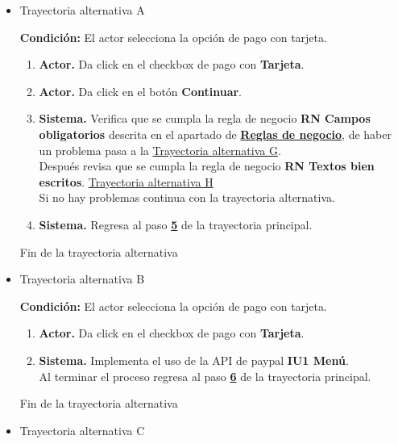 \begin{itemize}
	
	\item \hypertarget{TAA:CU4}{Trayectoria alternativa A}
	
	\noindent \textbf{Condición:} El actor selecciona la opción de pago con tarjeta.
	
	\begin{enumerate}
		\item \textbf{Actor.} Da click en el checkbox de pago con \textbf{Tarjeta}.
		\item \textbf{Actor.} Da click en el botón \textbf{Continuar}.
		\item \textbf{Sistema.} Verifica que se cumpla la regla de negocio \textbf{RN Campos obligatorios} descrita en el apartado de \hyperlink{RN}{\textbf{Reglas de negocio}}, de haber un problema pasa a la \hyperlink{TAC:CU3}{Trayectoria alternativa G}.
		\\Después revisa que se cumpla la regla de negocio \textbf{RN Textos bien escritos}. \hyperlink{TAD:CU3}{Trayectoria alternativa H}
		\\Si no hay problemas continua con la trayectoria alternativa.
		\item \textbf{Sistema.} Regresa al paso \hyperlink{p5}{\textbf{5}} de la trayectoria principal.
		
	\end{enumerate}
	
	Fin de la trayectoria alternativa
	
	\item \hypertarget{TAB:CU4}{Trayectoria alternativa B}
	
	\noindent \textbf{Condición:} El actor selecciona la opción de pago con tarjeta.
	
	\begin{enumerate}
		\item \textbf{Actor.} Da click en el checkbox de pago con \textbf{Tarjeta}.
		\item \textbf{Sistema.} Implementa el uso de la API de paypal  \textbf{IU1 Menú}.
		\\ Al terminar el proceso regresa al paso \hyperlink{p6}{\textbf{6}} de la trayectoria principal.
	\end{enumerate}
	
	Fin de la trayectoria alternativa
	
	\item \hypertarget{TAC:CU4}{Trayectoria alternativa C}
	

\end{itemize}
